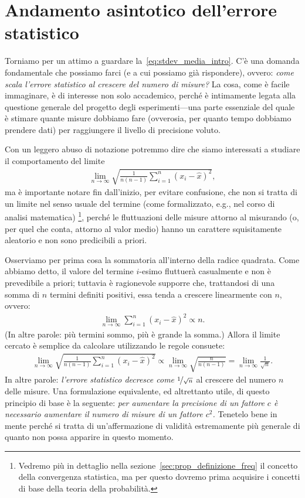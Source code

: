 \section{Andamento asintotico dell'errore statistico}
\label{sec:andamento_asintotico_stat}

Torniamo per un attimo a guardare la~\eqref{eq:stdev_media_intro}. C'è una
domanda fondamentale che possiamo farci (e a cui possiamo già rispondere),
ovvero: \emph{come scala l'errore statistico al crescere del numero di
misure?} La cosa, come è facile immaginare, è di interesse non solo
accademico, perché è intimamente legata alla questione generale del progetto
degli esperimenti---una parte essenziale del quale è stimare quante misure
dobbiamo fare (ovverosia, per quanto tempo dobbiamo prendere dati) per
raggiungere il livello di precisione voluto.

Con un leggero abuso di notazione potremmo dire che siamo interessati a
studiare il comportamento del limite
\begin{align*}
  \lim_{n \rightarrow \infty} \sqrt{\frac{1}{n(n - 1)}\sum_{i = 1}^n (x_i - \hat{x})^2},
\end{align*}
ma è importante notare fin dall'inizio, per evitare confusione, che non
si tratta di un limite nel senso usuale del termine (come formalizzato,
e.g., nel corso di analisi matematica)%
\footnote{Vedremo più in dettaglio
nella sezione~\ref{sec:prop_definizione_freq} il concetto della convergenza
statistica, ma per questo dovremo prima acquisire i concetti di base della
teoria della probabilità.}, perché le fluttuazioni delle misure attorno
al misurando (o, per quel che conta, attorno al valor medio) hanno un carattere
squisitamente aleatorio e non sono predicibili a priori.

Osserviamo per prima cosa la sommatoria all'interno della radice quadrata. Come
abbiamo detto, il valore del termine $i$-esimo fluttuerà casualmente e non
è prevedibile a priori; tuttavia è ragionevole supporre che,
trattandosi di una somma di $n$ termini definiti positivi, essa tenda a
crescere linearmente con $n$, ovvero:
\begin{align*}
  \lim_{n \rightarrow \infty} \sum_{i = 1}^n (x_i - \hat{x})^2 \propto n.
\end{align*}
(In altre parole: più termini sommo, più è grande la somma.) Allora il
limite cercato è semplice da calcolare utilizzando le regole consuete:
\begin{align}\label{eq:errore_radice_n}
  \lim_{n \rightarrow \infty} \sqrt{\frac{1}{n(n - 1)}\sum_{i = 1}^n (x_i - \hat{x})^2}
  \propto \lim_{n \rightarrow \infty} \sqrt{\frac{n}{n(n - 1)}} =
  \lim_{n \rightarrow \infty} \frac{1}{\sqrt{n}}.
\end{align}
In altre parole:
\emph{l'errore statistico decresce come $\nicefrac{1}{\sqrt{n}}$} al
crescere del numero $n$ delle misure. Una formulazione equivalente, ed
altrettanto utile, di questo principio di base è la seguente:
\emph{per aumentare la precisione di un fattore $c$ è necessario aumentare
il numero di misure di un fattore $c^2$.} Tenetelo bene in mente perché si
tratta di un'affermazione di validità estremamente più generale di quanto
non possa apparire in questo momento.

